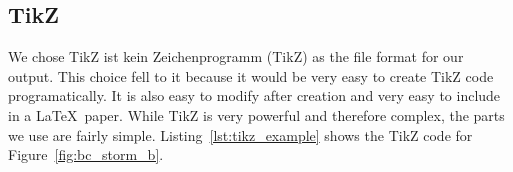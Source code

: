 \subsection*{TikZ}
We chose TikZ ist kein Zeichenprogramm (TikZ) as the file format for our output.
This choice fell to it because it would be very easy to create TikZ code programatically.
It is also easy to modify after creation and very easy to include in a \LaTeX\ paper.
While TikZ is very powerful and therefore complex, the parts we use are fairly simple.
Listing~\ref{lst:tikz_example} shows the TikZ code for Figure~\ref{fig:bc_storm_b}.
